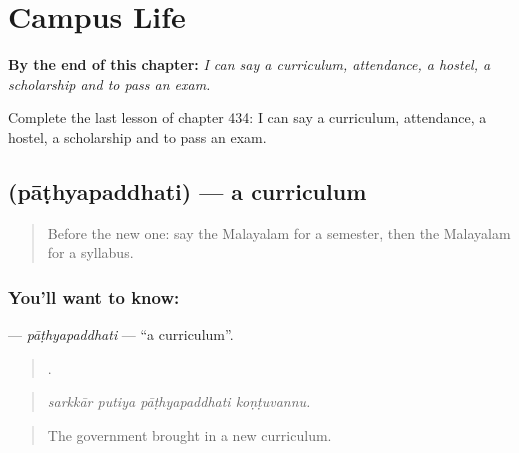 
\chapter{Campus Life}
\label{ch:ml-campus-life}

\begin{chapteropening}
\textbf{By the end of this chapter:} \emph{I can say a curriculum, attendance, a hostel, a scholarship and to pass an exam.}

Complete the last lesson of chapter 434: I can say a curriculum, attendance, a hostel, a scholarship and to pass an exam.
\end{chapteropening}

\section[\texorpdfstring{\ml{പാഠ്യപദ്ധതി} (pāṭhyapaddhati)}{പാഠ്യപദ്ധതി (pāṭhyapaddhati)}]{ (pāṭhyapaddhati) — a curriculum}

\label{lesson:ML-C434-pathyapaddhati}



\begin{quote}
Before the new one: say the Malayalam for a semester, then the Malayalam for a syllabus.
\end{quote}

\subsection*{You'll want to know: }
\textbf{} — \emph{pāṭhyapaddhati} — \textquotedblleft{}a curriculum\textquotedblright{}.

\begin{quote}
   .
\end{quote}

\begin{quote}
\emph{sarkkār putiya pāṭhyapaddhati koṇṭuvannu.}
\end{quote}

\begin{quote}
The government brought in a new curriculum.
\end{quote}

